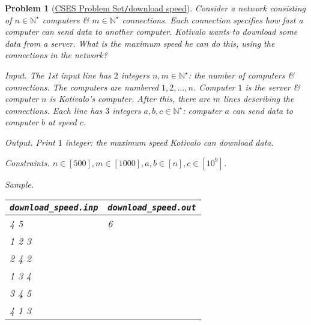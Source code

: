 \documentclass{article}
\newtheorem{problem}{Problem}
\begin{document}
\begin{problem}[\href{https://cses.fi/problemset/task/1694}{CSES Problem Set{\tt/}download speed}]
    Consider a network consisting of $n\in\mathbb{N}^\star$ computers \& $m\in\mathbb{N}^\star$ connections. Each connection specifies how fast a computer can send data to another computer. {\sc Kotivalo} wants to download some data from a server. What is the maximum speed he can do this, using the connections in the network?
    \item {\sf Input.} The 1st input line has $2$ integers $n,m\in\mathbb{N}^\star$: the number of computers \& connections. The computers are numbered $1,2,\ldots,n$. Computer $1$ is the server \& computer $n$ is Kotivalo's computer. After this, there are $m$ lines describing the connections. Each line has $3$ integers $a,b,c\in\mathbb{N}^\star$: computer $a$ can send data to computer $b$ at speed $c$.
    \item {\sf Output.} Print $1$ integer: the maximum speed Kotivalo can download data.
    \item {\sf Constraints.} $n\in[500],m\in[1000],a,b\in[n],c\in[10^9]$.
    \item {\sf Sample.}
    \begin{table}[H]
        \centering
        \begin{tabular}{|l|l|}
            \hline
            \verb|download_speed.inp| & \verb|download_speed.out| \\
            \hline
            4 5 & 6 \\
            1 2 3 & \\
            2 4 2 & \\
            1 3 4 & \\
            3 4 5 & \\
            4 1 3 & \\
            \hline
        \end{tabular}
    \end{table}
\end{problem}
\end{document}
